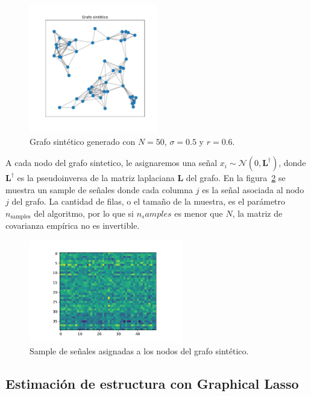 \documentclass{article}
\begin{document}
\begin{figure}[htb]
    \centering
    \includegraphics[width=0.5\textwidth]{imagenes/grafo_sintetico.pdf}
    \caption{Grafo sintético generado con $N=50$, $\sigma=0.5$ y $r=0.6$.}
    \label{fig:grafo_sintetico}
\end{figure}

A cada nodo del grafo sintetico, le asignaremos una señal $x_i \sim \mathcal{N}(0, \mathbf{L}^\dagger)$, donde $\mathbf{L}^\dagger$ es la pseudoinversa de la matriz laplaciana $\mathbf{L}$ del grafo. En la figura~\ref{fig:signals_X_pseudoinverse} se muestra un sample de señales
donde cada columna $j$ es la señal asociada al nodo $j$ del grafo. La cantidad de filas, o el tamaño de la muestra, es el parámetro $n_{\text{samples}}$ del algoritmo, por lo que si $n_samples$ es menor que $N$, la matriz de covarianza empírica no es invertible.

\begin{figure}[htb]
    \centering
    \includegraphics[width=0.6\textwidth]{imagenes/signals_X_pseudoinverse.pdf}
    \caption{Sample de señales asignadas a los nodos del grafo sintético.}
    \label{fig:signals_X_pseudoinverse}
\end{figure}

\subsection{Estimación de estructura con Graphical Lasso}
\end{document}
